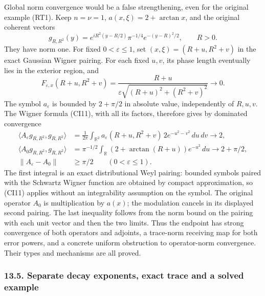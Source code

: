 \documentclass[
  11pt,
]{article}
\begin{document}
Global norm convergence would be a false strengthening, even for the
original example (RT1). Keep \(n=\nu=1\), \(a(x,\xi)=2+\arctan x\), and
the original coherent vectors \[
 g_{R,R^2}(y)=e^{iR^2(y-R/2)}
                \pi^{-1/4}e^{-(y-R)^2/2},\qquad R>0.
 \tag{RS16}
\] They have norm one. For fixed \(0<\varepsilon\leq1\), set
\((x,\xi)=(R+u,R^2+v)\) in the exact Gaussian Wigner pairing. For each
fixed \(u,v\), its phase length eventually lies in the exterior region,
and \[
 F_{\varepsilon,x}(R+u,R^2+v)
     =\frac{R+u}{\varepsilon
          \sqrt{(R+u)^2+(R^2+v)^2}}\longrightarrow0.
 \tag{RS17}
\] The symbol \(a_\varepsilon\) is bounded by \(2+\pi/2\) in absolute
value, independently of \(R,u,v\). The Wigner formula (CI11), with all
its factors, therefore gives by dominated convergence \[
 \begin{split}
 \langle A_\varepsilon g_{R,R^2},g_{R,R^2}\rangle
  &=\frac1{2\pi}\int_{\mathbb R^2}
       a_\varepsilon(R+u,R^2+v)\,2e^{-u^2-v^2}\,du\,dv
       \longrightarrow2,\\
 \langle A_0g_{R,R^2},g_{R,R^2}\rangle
  &=\pi^{-1/2}\int_{\mathbb R}
       (2+\arctan(R+u))e^{-u^2}\,du
       \longrightarrow2+\pi/2,\\
 \|A_\varepsilon-A_0\|&\geq\pi/2
                         \qquad(0<\varepsilon\leq1).
 \end{split}
 \tag{RS18}
\] The first integral is an exact distributional Weyl pairing: bounded
symbols paired with the Schwartz Wigner function are obtained by compact
approximation, so (CI11) applies without an integrability assumption on
the symbol. The original operator \(A_0\) is multiplication by \(a(x)\);
the modulation cancels in its displayed second pairing. The last
inequality follows from the norm bound on the pairing with each unit
vector and then the two limits. Thus the endpoint has strong convergence
of both operators and adjoints, a trace-norm receiving map for both
error powers, and a concrete uniform obstruction to operator-norm
convergence. Their types and mechanisms are all proved.

\subsubsection{13.5. Separate decay exponents, exact trace and a solved
example}\label{separate-decay-exponents-exact-trace-and-a-solved-example}
\end{document}

